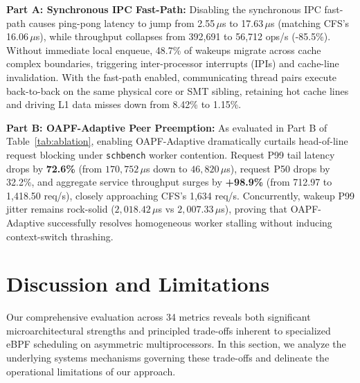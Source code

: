 \documentclass[letterpaper,twocolumn,10pt]{article}
\begin{document}
\textbf{Part A: Synchronous IPC Fast-Path:} Disabling the synchronous IPC fast-path causes ping-pong latency to jump from 2.55\,$\mu$s to 17.63\,$\mu$s (matching CFS's 16.06\,$\mu$s), while throughput collapses from 392,691 to 56,712 ops/s (-85.5\%). Without immediate local enqueue, 48.7\% of wakeups migrate across cache complex boundaries, triggering inter-processor interrupts (IPIs) and cache-line invalidation. With the fast-path enabled, communicating thread pairs execute back-to-back on the same physical core or SMT sibling, retaining hot cache lines and driving L1 data misses down from 8.42\% to 1.15\%.

\textbf{Part B: OAPF-Adaptive Peer Preemption:} As evaluated in Part B of Table~\ref{tab:ablation}, enabling OAPF-Adaptive dramatically curtails head-of-line request blocking under \texttt{schbench} worker contention. Request P99 tail latency drops by \textbf{72.6\%} (from $170{,}752\,\mu$s down to $46{,}820\,\mu$s), request P50 drops by 32.2\%, and aggregate service throughput surges by \textbf{+98.9\%} (from 712.97 to 1,418.50 req/s), closely approaching CFS's 1,634 req/s. Concurrently, wakeup P99 jitter remains rock-solid ($2{,}018.42\,\mu$s vs $2{,}007.33\,\mu$s), proving that OAPF-Adaptive successfully resolves homogeneous worker stalling without inducing context-switch thrashing.

\section{Discussion and Limitations}
\label{sec:discussion}

Our comprehensive evaluation across 34 metrics reveals both significant microarchitectural strengths and principled trade-offs inherent to specialized eBPF scheduling on asymmetric multiprocessors. In this section, we analyze the underlying systems mechanisms governing these trade-offs and delineate the operational limitations of our approach.
\end{document}
